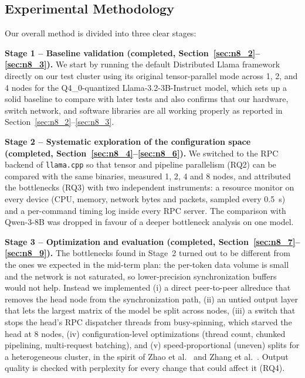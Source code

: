 \documentclass[11pt,a4paper]{article}
\begin{document}
\subsection{Experimental Methodology}\label{sec:n6_2}

Our overall method is divided into three clear stages:

\textbf{Stage 1 -- Baseline validation (completed, Section~\ref{sec:n8_2}--\ref{sec:n8_3}).} We start by running the default Distributed Llama framework directly on our test cluster using its original tensor-parallel mode across 1, 2, and 4 nodes for the Q4\_0-quantized Llama-3.2-3B-Instruct model, which sets up a solid baseline to compare with later tests and also confirms that our hardware, switch network, and software libraries are all working properly as reported in Section~\ref{sec:n8_2}--\ref{sec:n8_3}.

\textbf{Stage 2 -- Systematic exploration of the configuration space (completed, Section~\ref{sec:n8_4}--\ref{sec:n8_6}).} We switched to the RPC backend of \texttt{llama.cpp} so that tensor and pipeline parallelism (RQ2) can be compared with the same binaries, measured 1, 2, 4 and 8 nodes, and attributed the bottlenecks (RQ3) with two independent instruments: a resource monitor on every device (CPU, memory, network bytes and packets, sampled every 0.5~s) and a per-command timing log inside every RPC server. The comparison with Qwen-3-8B was dropped in favour of a deeper bottleneck analysis on one model.

\textbf{Stage 3 -- Optimization and evaluation (completed, Section~\ref{sec:n8_7}--\ref{sec:n8_9}).} The bottlenecks found in Stage~2 turned out to be different from the ones we expected in the mid-term plan: the per-token data volume is small and the network is not saturated, so lower-precision synchronization buffers would not help. Instead we implemented (i) a direct peer-to-peer allreduce that removes the head node from the synchronization path, (ii) an untied output layer that lets the largest matrix of the model be split across nodes, (iii) a switch that stops the head's RPC dispatcher threads from busy-spinning, which starved the head at 8 nodes, (iv) configuration-level optimizations (thread count, chunked pipelining, multi-request batching), and (v) speed-proportional (uneven) splits for a heterogeneous cluster, in the spirit of Zhao et al.~\cite{zhao2024} and Zhang et al.~\cite{zhang2024edgeshard}. Output quality is checked with perplexity for every change that could affect it (RQ4).
\end{document}
